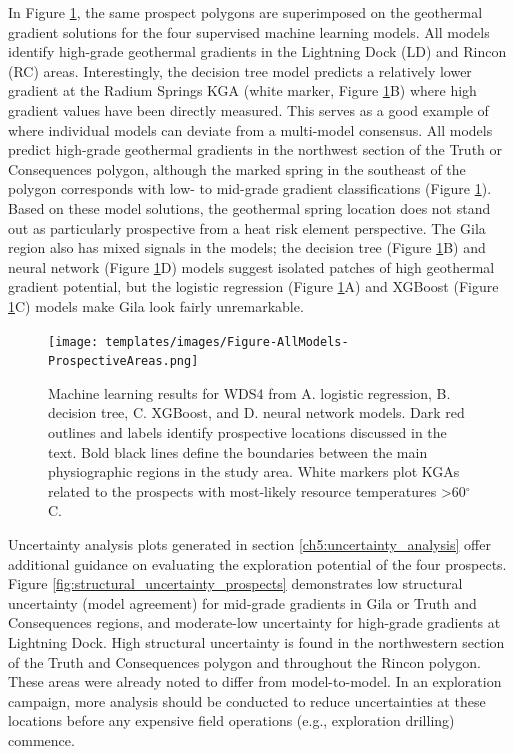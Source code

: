 In Figure \ref{fig:ml_models_prospects}, the same prospect polygons are superimposed on the geothermal gradient solutions for the four supervised machine learning models. All models identify high-grade geothermal gradients in the Lightning Dock (LD) and Rincon (RC) areas. Interestingly, the decision tree model predicts a relatively lower gradient at the Radium Springs KGA (white marker, Figure \ref{fig:ml_models_prospects}B) where high gradient values have been  directly measured. This serves as a good example of where individual models can deviate from a multi-model consensus. All models predict high-grade geothermal gradients in the northwest section of the Truth or Consequences polygon, although the marked spring in the southeast of the polygon corresponds with low- to mid-grade gradient classifications (Figure \ref{fig:ml_models_prospects}). Based on these model solutions, the geothermal spring location does not stand out as particularly prospective from a heat risk element perspective. The Gila region also has mixed signals in the models; the decision tree (Figure \ref{fig:ml_models_prospects}B) and neural network (Figure \ref{fig:ml_models_prospects}D) models suggest isolated patches of high geothermal gradient potential, but the logistic regression (Figure \ref{fig:ml_models_prospects}A) and XGBoost (Figure \ref{fig:ml_models_prospects}C) models make Gila look fairly unremarkable.

\begin{figure}
\centering
\texttt{[image: templates/images/Figure-AllModels-ProspectiveAreas.png]}
\caption[Machine learning models with prospective areas]
{Machine learning results for WDS4 from A. logistic regression, B. decision tree, C. XGBoost, and D. neural network models. Dark red outlines and labels identify prospective locations discussed in the text. Bold black lines define the boundaries between the main physiographic regions in the study area. White markers plot KGAs related to the prospects with most-likely resource temperatures >60$^\circ$C.}
\label{fig:ml_models_prospects}
\end{figure}

Uncertainty analysis plots generated in section \ref{ch5:uncertainty_analysis} offer additional guidance on evaluating the exploration potential of the four prospects. Figure \ref{fig:structural_uncertainty_prospects} demonstrates low structural uncertainty (model agreement) for mid-grade gradients in Gila or Truth and Consequences regions, and moderate-low uncertainty for high-grade gradients at Lightning Dock. High structural uncertainty is found in the northwestern section of the Truth and Consequences polygon and throughout the Rincon polygon. These areas were already noted to differ from model-to-model. In an exploration campaign, more analysis should be conducted to reduce uncertainties at these locations before any expensive field operations (e.g., exploration drilling) commence.


